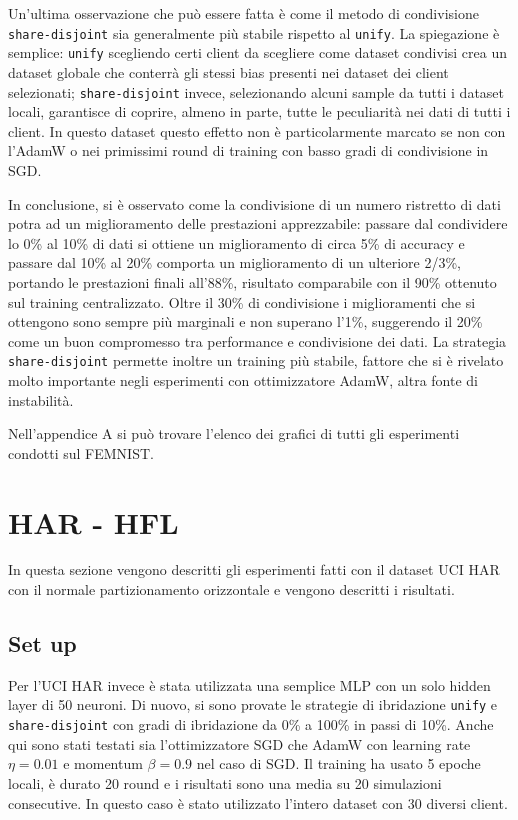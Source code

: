Un'ultima osservazione che può essere fatta è come il metodo di condivisione
\texttt{share-disjoint} sia generalmente più stabile rispetto al 
\texttt{unify}. La spiegazione è semplice: \texttt{unify} scegliendo 
certi client da scegliere come dataset condivisi crea un dataset 
globale che conterrà gli stessi bias presenti nei dataset dei client 
selezionati; \texttt{share-disjoint} invece, selezionando alcuni sample 
da tutti i dataset locali, garantisce di coprire, almeno in parte, 
tutte le peculiarità nei dati di tutti i client. In questo dataset 
questo effetto non è particolarmente marcato se non con l'AdamW o nei 
primissimi round di training con basso gradi di condivisione in SGD.

In conclusione, si è osservato come la condivisione di un numero ristretto 
di dati potra ad un miglioramento delle prestazioni apprezzabile: passare 
dal condividere lo 0\% al 10\% di dati si ottiene un miglioramento di 
circa 5\% di accuracy e passare dal 10\% al 20\% comporta un miglioramento
di un ulteriore 2/3\%, portando le prestazioni finali all'88\%, 
risultato comparabile con il 90\% ottenuto sul training centralizzato.
Oltre il 30\% di condivisione i miglioramenti che si ottengono sono 
sempre più marginali e non superano l'1\%, suggerendo il 20\% come un 
buon compromesso tra performance e condivisione dei dati.
La strategia \texttt{share-disjoint} permette inoltre un training più
stabile, fattore che si è rivelato molto importante negli esperimenti
con ottimizzatore AdamW, altra fonte di instabilità.

Nell'appendice A si può trovare l'elenco dei grafici di tutti gli 
esperimenti condotti sul FEMNIST.
    

\clearpage
\section{HAR - HFL}
In questa sezione vengono descritti gli esperimenti fatti con il dataset
UCI HAR con il normale partizionamento orizzontale e vengono descritti 
i risultati.

\subsection{Set up}
Per l'UCI HAR invece è stata utilizzata una semplice MLP con un solo 
hidden layer di 50 neuroni. Di nuovo, si sono provate le 
strategie di ibridazione \texttt{unify} e \texttt{share-disjoint} con 
gradi di ibridazione da 0\% a 100\% in passi di 10\%. Anche qui sono 
stati testati sia l'ottimizzatore SGD che AdamW con learning rate 
\(\eta = 0.01\) e momentum \(\beta = 0.9\) nel caso di SGD. Il 
training ha usato 5 epoche locali, è durato 20 round e i risultati 
sono una media su 20 simulazioni consecutive. In questo caso è stato 
utilizzato l'intero dataset con 30 diversi client.

